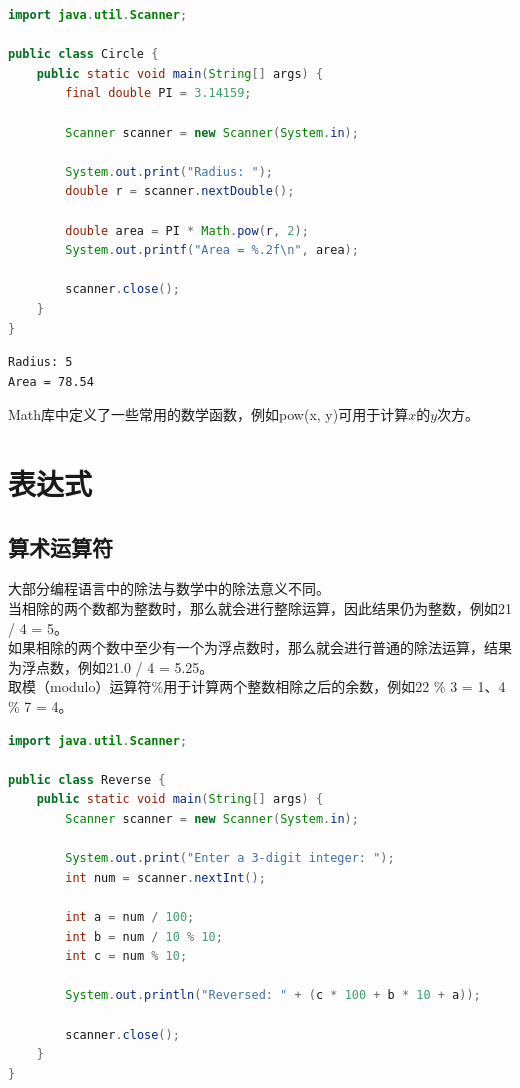 \vspace{0.5cm}


\begin{lstlisting}[language=Java]
import java.util.Scanner;

public class Circle {
	public static void main(String[] args) {
		final double PI = 3.14159;

		Scanner scanner = new Scanner(System.in);

		System.out.print("Radius: ");
		double r = scanner.nextDouble();

		double area = PI * Math.pow(r, 2);
		System.out.printf("Area = %.2f\n", area);
	
		scanner.close();
	}
}	
\end{lstlisting}

\begin{tcolorbox}
	\begin{verbatim}
Radius: 5
Area = 78.54
	\end{verbatim}
\end{tcolorbox}

Math库中定义了一些常用的数学函数，例如pow(x, y)可用于计算$ x $的$ y $次方。\\

\newpage

\section{表达式}

\subsection{算术运算符}

大部分编程语言中的除法与数学中的除法意义不同。\\

当相除的两个数都为整数时，那么就会进行整除运算，因此结果仍为整数，例如21 / 4 = 5。\\

如果相除的两个数中至少有一个为浮点数时，那么就会进行普通的除法运算，结果为浮点数，例如21.0 / 4 = 5.25。\\

取模（modulo）运算符\%用于计算两个整数相除之后的余数，例如22 \% 3 = 1、4 \% 7 = 4。\\


\begin{lstlisting}[language=Java]
import java.util.Scanner;

public class Reverse {
	public static void main(String[] args) {
		Scanner scanner = new Scanner(System.in);

		System.out.print("Enter a 3-digit integer: ");
		int num = scanner.nextInt();

		int a = num / 100;
		int b = num / 10 % 10;
		int c = num % 10;

		System.out.println("Reversed: " + (c * 100 + b * 10 + a));

		scanner.close();
	}
}
\end{lstlisting}


